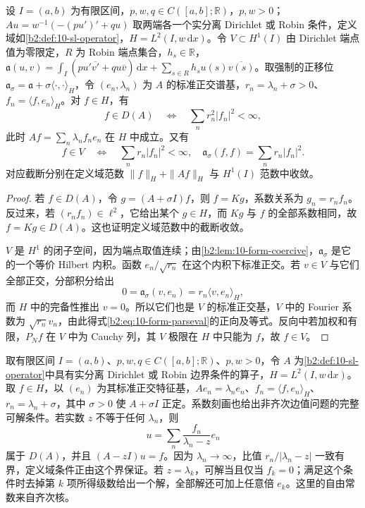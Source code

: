 \begin{proposition}[定义域和能量的系数刻画]\label{b2:prop:10-spectral-domains}
设 \(I=(a,b)\) 为有限区间，\(p,w,q\in C([a,b];\mathbb R)\)，\(p,w>0\)；\(Au=w^{-1}(-(pu')'+qu)\) 取两端各一个实分离 Dirichlet 或 Robin 条件，定义域如\cref{b2:def:10-sl-operator}，\(H=L^2(I,w\,\mathrm dx)\)。令 \(V\subset H^1(I)\) 由 Dirichlet 端点值为零限定，\(R\) 为 Robin 端点集合，\(h_s\in\mathbb R\)，\(\mathfrak a(u,v)=\int_I(pu'\overline{v'}+qu\overline v)\,\mathrm dx+\sum_{s\in R}h_su(s)\overline{v(s)}\)。取强制的正移位 \(\mathfrak a_\sigma=\mathfrak a+\sigma\langle\cdot,\cdot\rangle_H\)，令 \((e_n,\lambda_n)\) 为 \(A\) 的标准正交谱基，\(r_n=\lambda_n+\sigma>0\)、\(f_n=\langle f,e_n\rangle_H\)。对 \(f\in H\)，有
\[
 f\in D(A)\quad\Longleftrightarrow\quad
 \sum_n r_n^2|f_n|^2<\infty,
\]
此时 \(Af=\sum_n\lambda_nf_ne_n\) 在 \(H\) 中成立。又有
\begin{equation}\label{b2:eq:10-form-parseval}
 f\in V\quad\Longleftrightarrow\quad\sum_n r_n|f_n|^2<\infty,
 \quad\mathfrak a_\sigma(f,f)=\sum_n r_n|f_n|^2.
\end{equation}
对应截断分别在定义域范数 \(\|f\|_H+\|Af\|_H\) 与 \(H^1(I)\) 范数中收敛。
\end{proposition}
\begin{proof}
若 \(f\in D(A)\)，令 \(g=(A+\sigma I)f\)，则 \(f=Kg\)，系数关系为 \(g_n=r_nf_n\)。反过来，若 \((r_nf_n)\in\ell^2\)，它给出某个 \(g\in H\)，而 \(Kg\) 与 \(f\) 的全部系数相同，故 \(f=Kg\in D(A)\)。这也证明定义域范数中的截断收敛。

\(V\) 是 \(H^1\) 的闭子空间，因为端点取值连续；由\cref{b2:lem:10-form-coercive}，\(\mathfrak a_\sigma\) 是它的一个等价 Hilbert 内积。函数 \(e_n/\sqrt{r_n}\) 在这个内积下标准正交。若 \(v\in V\) 与它们全部正交，分部积分给出
\[
 0=\mathfrak a_\sigma(v,e_n)=r_n\langle v,e_n\rangle_H,
\]
而 \(H\) 中的完备性推出 \(v=0\)。所以它们也是 \(V\) 的标准正交基，\(V\) 中的 Fourier 系数为 \(\sqrt{r_n}v_n\)，由此得式\eqref{b2:eq:10-form-parseval}的正向及等式。反向中若加权和有限，\(P_Nf\) 在 \(V\) 中为 Cauchy 列，其 \(V\) 极限在 \(H\) 中只能为 \(f\)，故 \(f\in V\)。
\end{proof}

取有限区间 \(I=(a,b)\)、\(p,w,q\in C([a,b];\mathbb R)\)、\(p,w>0\)，令 \(A\) 为\cref{b2:def:10-sl-operator}中具有实分离 Dirichlet 或 Robin 边界条件的算子，\(H=L^2(I,w\,\mathrm dx)\)。取 \(f\in H\)，以 \((e_n)\) 为其标准正交特征基，\(Ae_n=\lambda_ne_n\)、\(f_n=\langle f,e_n\rangle_H\)、\(r_n=\lambda_n+\sigma\)，其中 \(\sigma>0\) 使 \(A+\sigma I\) 正定。系数刻画也给出非齐次边值问题的完整可解条件。若实数 \(z\) 不等于任何 \(\lambda_n\)，则
\[
 u=\sum_n\dfrac{f_n}{\lambda_n-z}e_n
\]
属于 \(D(A)\)，并且 \((A-zI)u=f\)。因为 \(\lambda_n\to\infty\)，比值 \(r_n/|\lambda_n-z|\) 一致有界，定义域条件正由这个界保证。若 \(z=\lambda_k\)，可解当且仅当 \(f_k=0\)；满足这个条件时去掉第 \(k\) 项所得级数给出一个解，全部解还可加上任意倍 \(e_k\)。这里的自由常数来自齐次核。

